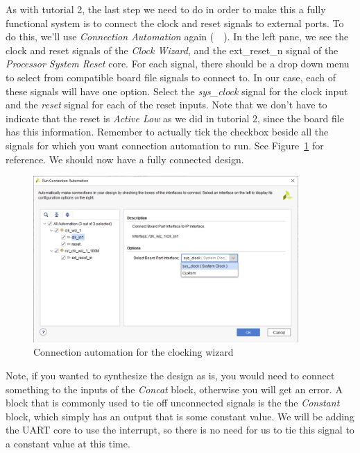 \documentclass[11pt]{article}
\begin{document}
As with tutorial 2, the last step we need to do in order to make this a fully functional system is to connect the clock and reset signals to external ports. To do this, we'll use \textit{Connection Automation} again
(~~). 
In the left pane, we see the clock and reset signals of the \textit{Clock Wizard}, and the ext\_reset\_n signal of the \textit{Processor System Reset} core. For each signal, there should be a drop down menu to select from compatible board file signals to connect to. In our case, each of these signals will have one option. Select the \textit{sys\_clock} signal for the clock input and the \textit{reset} signal for each of the reset inputs. Note that we don't have to indicate that the reset is \textit{Active Low} as we did in tutorial 2, since the board file has this information. Remember to actually tick the checkbox beside all the signals for which you want connection automation to run. See Figure~\ref{fig:conn_auto_clock2} for reference. We should now have a fully connected design.

\begin{figure}[h]
    \centering
    \includegraphics[width=0.9\textwidth]{images/conn_auto_clock2.png}
    \caption{Connection automation for the clocking wizard}
    \label{fig:conn_auto_clock2}
\end{figure}

Note, if you wanted to synthesize the design as is, you would need to connect something to the inputs of the \textit{Concat} block, otherwise you will get an error. A block that is commonly used to tie off unconnected signals is the the \textit{Constant} block, which simply has an output that is some constant value. We will be adding the UART core to use the interrupt, so there is no need for us to tie this signal to a constant value at this time.
\end{document}
